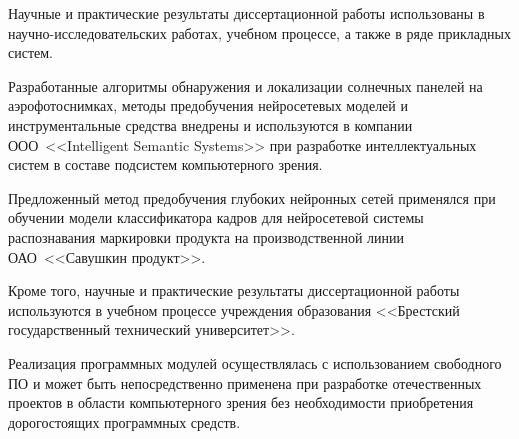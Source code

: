 
Научные и практические результаты диссертационной работы использованы в научно-исследовательских работах, учебном процессе, а также в ряде прикладных систем.

Разработанные алгоритмы обнаружения и локализации солнечных панелей на аэрофотоснимках, методы предобучения нейросетевых моделей и инструментальные средства внедрены и используются в компании ООО~<<Intelligent Semantic Systems>> при разработке интеллектуальных систем в составе подсистем компьютерного зрения.

Предложенный метод предобучения глубоких нейронных сетей применялся при обучении модели классификатора кадров для нейросетевой системы распознавания маркировки продукта на производственной линии ОАО~<<Савушкин продукт>>.

Кроме того, научные и практические результаты диссертационной работы используются в учебном процессе учреждения образования <<Брестский государственный технический университет>>.


Реализация программных модулей осуществлялась с использованием свободного ПО и может быть непосредственно применена при разработке отечественных проектов в области компьютерного зрения без необходимости приобретения дорогостоящих программных средств.


